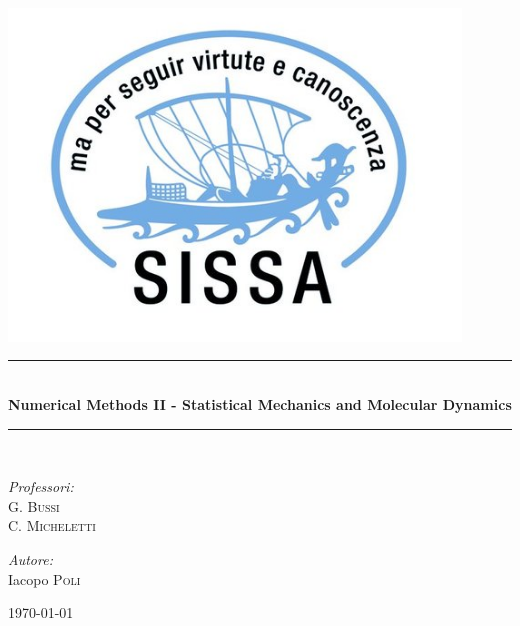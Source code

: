 \documentclass[a4paper, italian, openany]{book}
\newcommand{\HRule}{\rule{\linewidth}{0.5mm}}
\begin{document}
\pagestyle{fancy}
\pagestyle{plain}

\begin{titlepage}
\begin{center}

\includegraphics[width=0.9\textwidth]{img/sissa.jpg}~\\[1cm]

\HRule \\[0.4cm]
{ \large \bfseries Numerical Methods II - Statistical Mechanics and Molecular Dynamics \\[0.4cm] }

\HRule \\[1.5cm]

\noindent
\begin{minipage}[t]{0.4\textwidth}
\begin{flushleft} \large
\emph{Professori:}\\
G. \textsc{Bussi}\\
C. \textsc{Micheletti}
\end{flushleft}
\end{minipage}
\begin{minipage}[t]{0.4\textwidth}
\begin{flushright} \large
\emph{Autore:} \\
Iacopo \textsc{Poli}\\
\end{flushright}
\end{minipage}

\vfill

{\small \today}

\end{center}
\end{titlepage}
\end{document}
